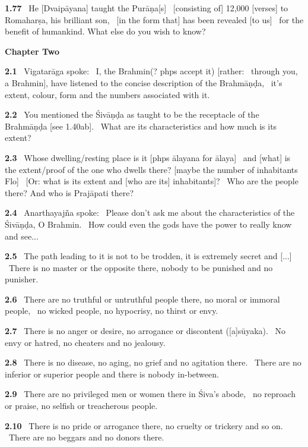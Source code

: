 \documentclass{article}
\begin{document}
\textbf{1.77}%
\ He [Dvaipāyana] taught the Purāṇa[s]%
\ [consisting of] 12,000 [verses] to Romaharṣa, his brilliant son,%
\                 [in the form that] has been revealed [to us]%
\ for the benefit of humankind. What else do you wish to know?%
\vfill\pagebreak\begin{center}{\large\textbf{  Chapter Two 
}}\end{center}


\textbf{2.1}%
\ Vigatarāga spoke:%
\ I, the Brahmin(? phps accept it) [rather:%
\         through you, a Brahmin], have listened to the concise description of the Brahmāṇḍa,%
\         it's extent, colour, form and the numbers associated with it.%


\textbf{2.2}%
\ You mentioned the Śivāṇḍa as taught to be the receptacle of the Brahmāṇḍa [see 1.40ab].%
\              What are its characteristics and how much is its extent?%


\textbf{2.3}%
\ Whose dwelling/resting place is it [phps ālayana for ālaya]%
\               and [what] is the extent/proof of the one who dwells there? [maybe the number of inhabitants Flo]%
\              [Or: what is its extent and [who are its] inhabitants]?%
\              Who are the people there? And who is Prajāpati there?%


\textbf{2.4}%
\ Anarthayajña spoke:%
\ Please don't ask me about the characteristics of the Śivāṇḍa, O Brahmin.%
\              How could even the gods have the power to really know and see...%


\textbf{2.5}%
\ The path leading to it is not to be trodden, it is extremely secret and [...]%
\         There is no master or the opposite there, nobody to be punished and no punisher.%


\textbf{2.6}%
\ There are no truthful or untruthful people there, no moral or immoral people,%
\              no wicked people, no hypocrisy, no thirst or envy.%


\textbf{2.7}%
\ There is no anger or desire, no arrogance or discontent ([a]sūyaka).%
\                 No envy or hatred, no cheaters and no jealousy.%


\textbf{2.8}%
\ There is no disease, no aging, no grief and no agitation there.%
\                 There are no inferior or superior people and there is nobody in-between.%


\textbf{2.9}%
\ There are no privileged men or women there in Śiva's abode,%
\ no reproach or praise, no selfish or treacherous people.%


\textbf{2.10}%
\ There is no pride or arrogance there, no cruelty or trickery and so on.%
\              There are no beggars and no donors there.%
\end{document}
